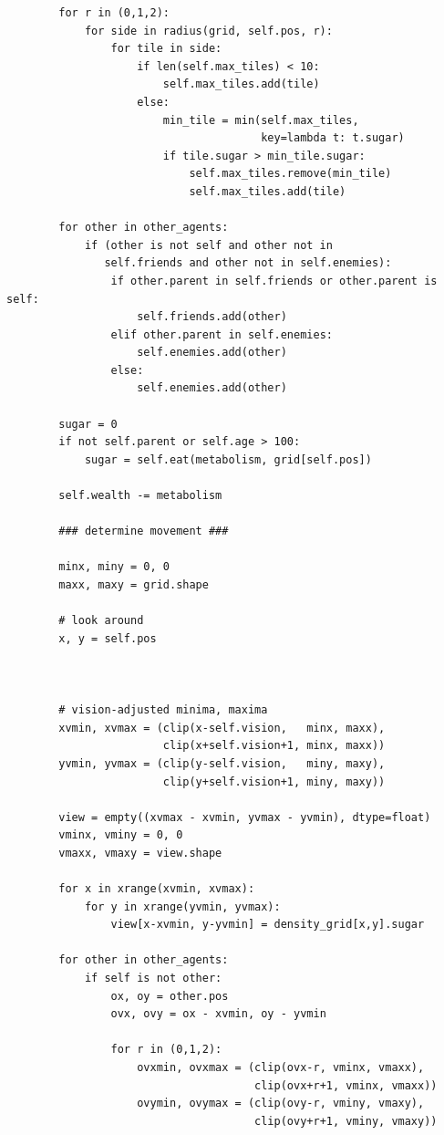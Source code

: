 \begin{verbatim}
        for r in (0,1,2):
            for side in radius(grid, self.pos, r):
                for tile in side:
                    if len(self.max_tiles) < 10:
                        self.max_tiles.add(tile)
                    else:
                        min_tile = min(self.max_tiles,
                                       key=lambda t: t.sugar)
                        if tile.sugar > min_tile.sugar:
                            self.max_tiles.remove(min_tile)
                            self.max_tiles.add(tile)
        
        for other in other_agents:
            if (other is not self and other not in 
               self.friends and other not in self.enemies):
                if other.parent in self.friends or other.parent is self:
                    self.friends.add(other)
                elif other.parent in self.enemies:
                    self.enemies.add(other)
                else:
                    self.enemies.add(other)
                    
        sugar = 0
        if not self.parent or self.age > 100:
            sugar = self.eat(metabolism, grid[self.pos])
        
        self.wealth -= metabolism
        
        ### determine movement ###
        
        minx, miny = 0, 0
        maxx, maxy = grid.shape
        
        # look around
        x, y = self.pos
        
        
        
        # vision-adjusted minima, maxima
        xvmin, xvmax = (clip(x-self.vision,   minx, maxx),
                        clip(x+self.vision+1, minx, maxx))
        yvmin, yvmax = (clip(y-self.vision,   miny, maxy), 
                        clip(y+self.vision+1, miny, maxy))
        
        view = empty((xvmax - xvmin, yvmax - yvmin), dtype=float)
        vminx, vminy = 0, 0
        vmaxx, vmaxy = view.shape
        
        for x in xrange(xvmin, xvmax):
            for y in xrange(yvmin, yvmax):
                view[x-xvmin, y-yvmin] = density_grid[x,y].sugar
        
        for other in other_agents:
            if self is not other:
                ox, oy = other.pos
                ovx, ovy = ox - xvmin, oy - yvmin

                for r in (0,1,2):
                    ovxmin, ovxmax = (clip(ovx-r, vminx, vmaxx), 
                                      clip(ovx+r+1, vminx, vmaxx))
                    ovymin, ovymax = (clip(ovy-r, vminy, vmaxy), 
                                      clip(ovy+r+1, vminy, vmaxy))


\end{verbatim}
